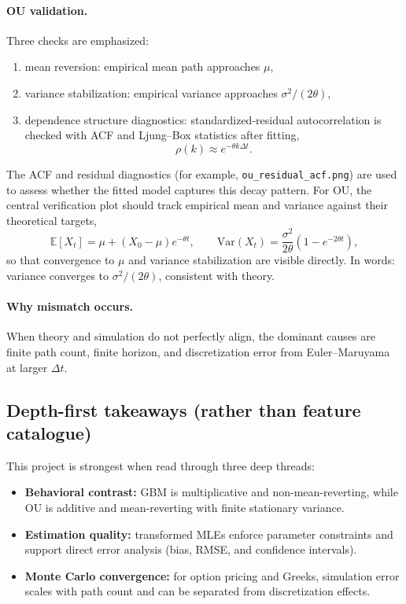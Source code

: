 \documentclass[11pt]{article}
\newcommand{\E}{\mathbb{E}}
\newcommand{\Var}{\mathrm{Var}}
\begin{document}
\paragraph{OU validation.}
Three checks are emphasized:
\begin{enumerate}[leftmargin=1.5em]
  \item mean reversion: empirical mean path approaches $\mu$,
  \item variance stabilization: empirical variance approaches $\sigma^2/(2\theta)$,
  \item dependence structure diagnostics: standardized-residual autocorrelation is checked with ACF and Ljung--Box statistics after fitting,
  \begin{equation*}
    \rho(k) \approx e^{-\theta k\Delta t}.
  \end{equation*}
\end{enumerate}
The ACF and residual diagnostics (for example, \texttt{ou\_residual\_acf.png}) are used to assess whether the fitted model captures this decay pattern.
For OU, the central verification plot should track empirical mean and variance against their theoretical targets,
\begin{equation}
  \E[X_t] = \mu + (X_0-\mu)e^{-\theta t},
  \qquad
  \Var(X_t)=\frac{\sigma^2}{2\theta}\left(1-e^{-2\theta t}\right),
\end{equation}
so that convergence to $\mu$ and variance stabilization are visible directly. In words: variance converges to $\sigma^2/(2\theta)$, consistent with theory.

\paragraph{Why mismatch occurs.}
When theory and simulation do not perfectly align, the dominant causes are finite path count, finite horizon, and discretization error from Euler--Maruyama at larger $\Delta t$.

\subsection{Depth-first takeaways (rather than feature catalogue)}

This project is strongest when read through three deep threads:
\begin{itemize}[leftmargin=1.2em]
  \item \textbf{Behavioral contrast:} GBM is multiplicative and non-mean-reverting, while OU is additive and mean-reverting with finite stationary variance.
  \item \textbf{Estimation quality:} transformed MLEs enforce parameter constraints and support direct error analysis (bias, RMSE, and confidence intervals).
  \item \textbf{Monte Carlo convergence:} for option pricing and Greeks, simulation error scales with path count and can be separated from discretization effects.
\end{itemize}
\end{document}

